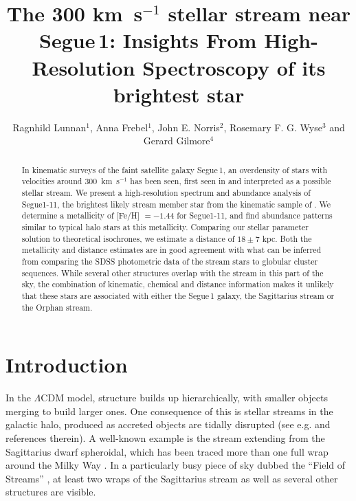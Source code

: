 \documentclass[manuscript]{aastex}
\begin{document}
\title{The 300 km~s$^{-1}$ stellar stream near Segue\,1: Insights From High-Resolution Spectroscopy of its brightest star}
\author{Ragnhild Lunnan$^1$,  Anna Frebel$^1$, John E. Norris$^2$, Rosemary F. G. Wyse$^3$ and Gerard Gilmore$^4$}


\begin{abstract}
In kinematic surveys of the faint satellite galaxy Segue\,1, an overdensity of stars with velocities around 300~km~s$^{-1}$ has been seen, first seen in \citet{Geha2009} and interpreted as a possible stellar stream. We present a high-resolution spectrum and abundance analysis of Segue1-11, the brightest likely stream member star from the kinematic sample of \citet{Norris2010a}. We determine a metallicity of [Fe/H] $ = -1.44$ for Segue1-11, and find abundance patterns similar to typical halo stars at this metallicity. Comparing our stellar parameter solution to theoretical isochrones, we estimate a distance of $18 \pm 7$ kpc. Both the metallicity and distance estimates are in good agreement with what can be inferred from comparing the SDSS photometric data of the stream stars to globular cluster sequences. While several other structures overlap with the stream in this part of the sky, the combination of kinematic, chemical and distance information makes it unlikely that these stars are associated with either the Segue\,1 galaxy, the Sagittarius stream or the Orphan stream.

\end{abstract}





\section{Introduction}
\label{sec:intro}


In the $\Lambda$CDM model, structure builds up hierarchically, with smaller objects merging to build larger ones. One consequence of this is stellar streams in the galactic halo, produced as accreted objects are tidally disrupted (see e.g. \citealt{Lynden-Bell1995} and references therein). A well-known example is the stream extending from the Sagittarius dwarf spheroidal, which has been traced more than one full wrap around the Milky Way \citep[e.g.][]{Ibata1994, Majewski2003}. In a particularly busy piece of sky dubbed the ``Field of Streams'' \citep{Belokurov2006b}, at least two wraps of the Sagittarius stream as well as several other structures are visible.
\end{document}
